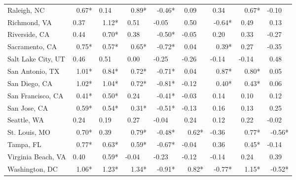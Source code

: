 \begin{tabular}{lrrrrrrrr}
	Raleigh, NC        &  0.67* &  0.14~~ &   0.89* &  -0.46* &  0.09~~ &  0.34~~ &   0.67* & -0.10~~ \\
	Richmond, VA       & 0.37~~ &   1.12* &  0.51~~ & -0.05~~ &  0.50~~ &  -0.64* &  0.49~~ &  0.13~~ \\
	Riverside, CA      & 0.44~~ &   0.70* &  0.38~~ &  -0.50* & -0.05~~ &  0.20~~ &  0.33~~ & -0.27~~ \\
	Sacramento, CA     &  0.75* &   0.57* &   0.65* &  -0.72* &  0.04~~ &   0.39* &  0.27~~ & -0.35~~ \\
	Salt Lake City, UT & 0.46~~ &  0.51~~ &  0.00~~ & -0.25~~ & -0.26~~ & -0.14~~ & -0.14~~ &  0.48~~ \\
	San Antonio, TX    &  1.01* &   0.84* &   0.72* &  -0.71* &  0.04~~ &   0.87* &   0.80* &  0.05~~ \\
	San Diego, CA      &  1.02* &   1.04* &   0.72* &  -0.81* & -0.12~~ &   0.40* &   0.43* &  0.06~~ \\
	San Francisco, CA  &  0.41* &   0.50* &  0.24~~ &  -0.41* & -0.03~~ &  0.14~~ &  0.10~~ &  0.12~~ \\
	San Jose, CA       &  0.59* &   0.54* &   0.31* &  -0.51* & -0.13~~ &  0.16~~ &  0.13~~ &  0.25~~ \\
	Seattle, WA        & 0.24~~ &  0.19~~ &  0.27~~ & -0.04~~ &  0.24~~ &  0.12~~ &  0.22~~ & -0.02~~ \\
	St. Louis, MO      &  0.70* &  0.39~~ &   0.79* &  -0.48* &   0.62* & -0.36~~ &   0.77* &  -0.56* \\
	Tampa, FL          &  0.77* &   0.63* &   0.59* &  -0.67* & -0.04~~ &  0.36~~ &   0.45* & -0.14~~ \\
	Virginia Beach, VA & 0.40~~ &   0.59* & -0.04~~ & -0.23~~ & -0.12~~ & -0.14~~ &  0.24~~ &  0.39~~ \\
	Washington, DC     &  1.06* &   1.23* &   1.34* &  -0.91* &   0.82* &  -0.77* &   1.15* &  -0.52* \\ \bottomrule
\end{tabular}
\normalsize